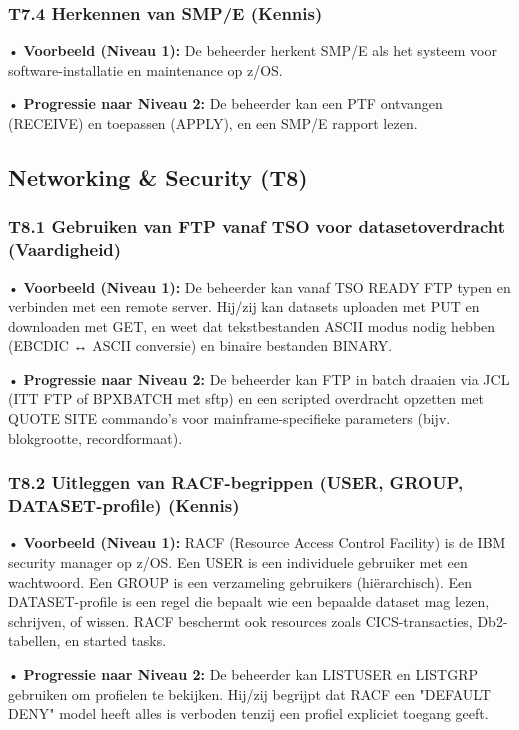 \subsubsection{T7.4 Herkennen van SMP/E (Kennis)}

• \textbf{Voorbeeld (Niveau 1):} De beheerder herkent SMP/E als het systeem voor software-installatie en maintenance op z/OS.

• \textbf{Progressie naar Niveau 2:} De beheerder kan een PTF ontvangen (RECEIVE) en toepassen (APPLY), en een SMP/E rapport lezen.

\subsection{Networking \& Security (T8)}

\subsubsection{T8.1 Gebruiken van FTP vanaf TSO voor datasetoverdracht (Vaardigheid)}

• \textbf{Voorbeeld (Niveau 1):} De beheerder kan vanaf TSO READY {FTP} typen en verbinden met een remote server. Hij/zij kan datasets uploaden met {PUT} en downloaden met {GET}, en weet dat tekstbestanden {ASCII} modus nodig hebben (EBCDIC ↔ ASCII conversie) en binaire bestanden {BINARY}.

• \textbf{Progressie naar Niveau 2:} De beheerder kan FTP in batch draaien via JCL (ITT FTP of BPXBATCH met sftp) en een scripted overdracht opzetten met {QUOTE SITE} commando's voor mainframe-specifieke parameters (bijv. blokgrootte, recordformaat).

\subsubsection{T8.2 Uitleggen van RACF-begrippen (USER, GROUP, DATASET-profile) (Kennis)}

• \textbf{Voorbeeld (Niveau 1):} RACF (Resource Access Control Facility) is de IBM security manager op z/OS. Een {USER} is een individuele gebruiker met een wachtwoord. Een {GROUP} is een verzameling gebruikers (hiërarchisch). Een {DATASET-profile} is een regel die bepaalt wie een bepaalde dataset mag lezen, schrijven, of wissen. RACF beschermt ook resources zoals CICS-transacties, Db2-tabellen, en started tasks.

• \textbf{Progressie naar Niveau 2:} De beheerder kan {LISTUSER} en {LISTGRP} gebruiken om profielen te bekijken. Hij/zij begrijpt dat RACF een "DEFAULT DENY" model heeft alles is verboden tenzij een profiel expliciet toegang geeft.


